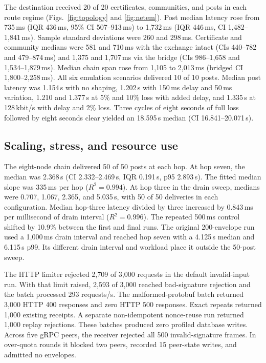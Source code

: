 \documentclass[conference,a4paper,10pt]{IEEEtran}
\begin{document}
The destination received 20 of 20 certificates, communities, and posts in each route regime (Figs.~\ref{fig:topology} and \ref{fig:netem}). Post median latency rose from 735\,ms (IQR 436\,ms, 95\% CI 507--913\,ms) to 1,732\,ms (IQR 446\,ms, CI 1,482--1,841\,ms). Sample standard deviations were 260 and 298\,ms. Certificate and community medians were 581 and 710\,ms with the exchange intact (CIs 440--782 and 479--874\,ms) and 1,375 and 1,707\,ms via the bridge (CIs 986--1,658 and 1,534--1,879\,ms). Median chain span rose from 1,105 to 2,013\,ms (bridged CI 1,800--2,258\,ms). All six emulation scenarios delivered 10 of 10 posts. Median post latency was 1.154\,s with no shaping, 1.202\,s with 150\,ms delay and 50\,ms variation, 1.210 and 1.377\,s at 5\% and 10\% loss with added delay, and 1.335\,s at 128\,kbit/s with delay and 2\% loss. Three cycles of eight seconds of full loss followed by eight seconds clear yielded an 18.595\,s median (CI 16.841--20.071\,s).

\subsection{Scaling, stress, and resource use}

The eight-node chain delivered 50 of 50 posts at each hop. At hop seven, the median was 2.368\,s (CI 2.332--2.469\,s, IQR 0.191\,s, p95 2.893\,s). The fitted median slope was 335\,ms per hop ($R^2=0.994$). At hop three in the drain sweep, medians were 0.707, 1.067, 2.365, and 5.035\,s, with 50 of 50 deliveries in each configuration. Median hop-three latency divided by three increased by 0.843\,ms per millisecond of drain interval ($R^2=0.996$). The repeated 500\,ms control shifted by 10.9\% between the first and final runs. The original 200-envelope run used a 1,000\,ms drain interval and reached hop seven with a 4.125\,s median and 6.115\,s p99. Its different drain interval and workload place it outside the 50-post sweep.

The HTTP limiter rejected 2,709 of 3,000 requests in the default invalid-input run. With that limit raised, 2,593 of 3,000 reached bad-signature rejection and the batch processed 293 requests/s. The malformed-protobuf batch returned 3,000 HTTP 400 responses and zero HTTP 500 responses. Exact repeats returned 1,000 existing receipts. A separate non-idempotent nonce-reuse run returned 1,000 replay rejections. These batches produced zero profiled database writes. Across five gRPC peers, the receiver rejected all 500 invalid-signature frames. In over-quota rounds it blocked two peers, recorded 15 peer-state writes, and admitted no envelopes.
\end{document}
